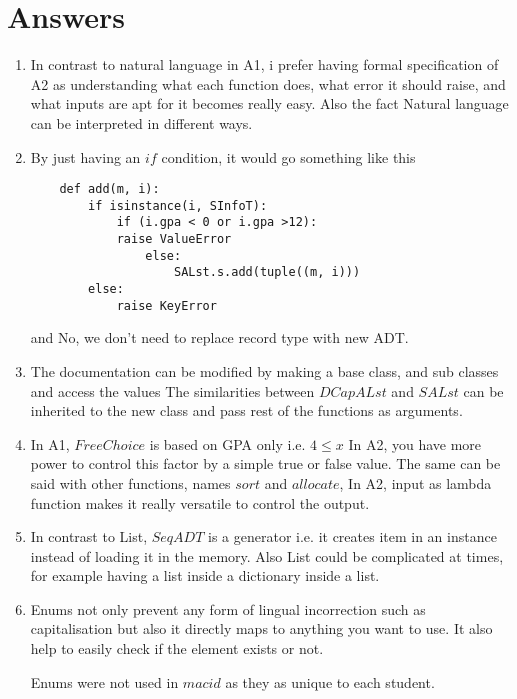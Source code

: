 \documentclass[12pt]{article}
\begin{document}
\section{Answers}

\begin{enumerate}

\item In contrast to natural language in A1, i prefer having formal specification of A2 as understanding what each function does, what error it should raise, and what inputs are apt for it becomes really easy. Also the fact Natural language can be interpreted in different ways.
\item By just having an $if$ condition, it would go something like this
\begin{lstlisting}
    def add(m, i):
        if isinstance(i, SInfoT):
        	if (i.gpa < 0 or i.gpa >12):  
		 	raise ValueError	
            	else:
            		SALst.s.add(tuple((m, i)))
        else:
            raise KeyError
\end{lstlisting}
and No, we don't need to replace record type with new ADT.
\item
The documentation can be modified by making a base class, and sub classes and access the values
The similarities between $DCapALst$ and $SALst$ can be inherited to the new class and pass rest of the functions as arguments.

\item
In A1, $FreeChoice$ is based on GPA only i.e. $4 \le x$
In A2, you have more power to control this factor by a simple true or false value.
The same can be said with other functions, names $sort$ and $allocate$, In A2, input as lambda function makes it really versatile to control the output.
\item
In contrast to List, $SeqADT$ is a generator i.e. it creates item in an instance instead of loading it in the memory. Also List could be complicated at times, for example having a list inside a dictionary inside a list. 

\item
Enums not only prevent any form of lingual incorrection such as capitalisation but also it directly maps to anything you want to use. It also help to easily check if the element exists or not. 

Enums were not used in $macid$ as they as unique to each student.

\end{enumerate}

\newpage
\end{document}
